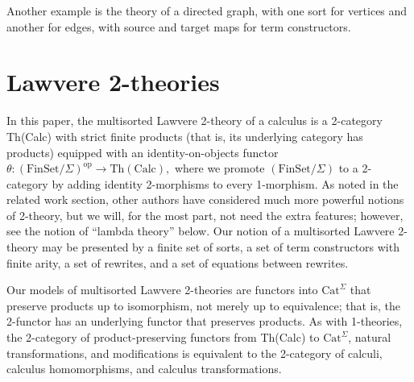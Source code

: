 \documentclass{llncs}
\newcommand{\maps}{\colon}
\newcommand{\FinSet}{\mathrm{FinSet}}
\newcommand{\Cat}{\mathrm{Cat}}
\newcommand{\op}{\mathrm{op}}
\begin{document}
Another example is the theory of a directed graph, with one sort for vertices and another for edges, with source and target maps for term constructors.

\section {Lawvere 2-theories}
In this paper, the multisorted Lawvere 2-theory of a calculus is a 2-category Th(Calc) with strict finite products (that is, its underlying category has products) equipped with an identity-on-objects functor $\theta\maps (\FinSet/\Sigma)^\op \to \mathrm{Th(Calc)},$ where we promote $(\FinSet/\Sigma)$ to a 2-category by adding identity 2-morphisms to every 1-morphism.  As noted in the related work section, other authors have considered much more powerful notions of 2-theory, but we will, for the most part, not need the extra features; however, see the notion of ``lambda theory'' below.  Our notion of a multisorted Lawvere 2-theory may be presented by a finite set of sorts, a set of term constructors with finite arity, a set of rewrites, and a set of equations between rewrites.  

Our models of multisorted Lawvere 2-theories are functors into $\Cat^\Sigma$ that preserve products up to isomorphism, not merely up to equivalence; that is, the 2-functor has an underlying functor that preserves products.  As with 1-theories, the 2-category of product-preserving functors from Th(Calc) to $\Cat^\Sigma$, natural transformations, and modifications is equivalent to the 2-category of calculi, calculus homomorphisms, and calculus transformations.
\end{document}
